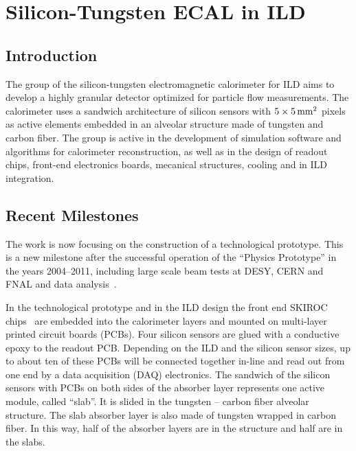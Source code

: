 \section{Silicon-Tungsten ECAL in ILD}

\subsection{Introduction}
The group of the silicon-tungsten electromagnetic calorimeter for ILD aims to develop a highly
granular detector optimized for particle flow measurements. The calorimeter uses a
sandwich architecture of silicon sensors with $\unit[5\times5]{mm^2}$ pixels as active elements embedded in an
alveolar structure made of tungsten and carbon fiber. The group is active in the development of
simulation software and algorithms for calorimeter reconstruction, as well as in the design of readout
chips, front-end electronics boards, mecanical structures, cooling and in ILD
integration.

\subsection{Recent Milestones}
The work is now focusing on the construction of a technological prototype. This
is a new milestone after the successful operation of the ``Physics Prototype'' in the
years 2004--2011, including large scale beam tests at DESY, CERN and FNAL and data
analysis~\cite{1748-0221-3-08-P08001,2009JPhCS.160a2065B,2010JInst...5T5007A,Adloff201197,1748-0221-6-07-P07005}.

In the technological prototype and in the ILD design the front end SKIROC
chips~\cite{1748-0221-6-12-C12040,Amjad201578} are embedded into the calorimeter layers and mounted on
multi-layer printed circuit boards (PCBs). Four silicon sensors are glued with
a conductive epoxy to the readout PCB. Depending on the ILD and the silicon
sensor sizes, up to about ten of these PCBs will be connected together in-line
and read out from one end by a data acquisition (DAQ) electronics. The sandwich
of the silicon sensors with PCBs on both sides of the absorber layer
represents one active module, called ``slab''. It is slided in the tungsten --
carbon fiber alveolar structure. The slab absorber layer is also made of
tungsten wrapped in carbon fiber. In this way, half of the absorber layers are
in the structure and half are in the slabs.

